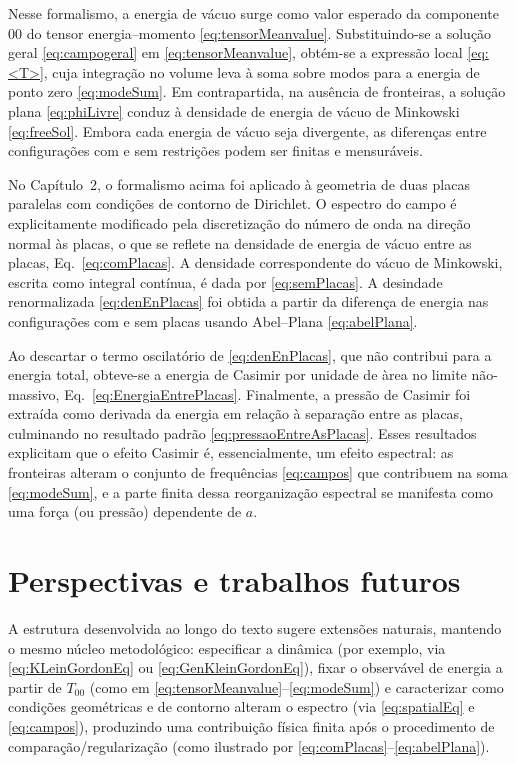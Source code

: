 Nesse formalismo, a energia de vácuo surge como valor esperado da componente $00$ do tensor energia--momento \eqref{eq:tensorMeanvalue}. Substituindo-se a solução geral \eqref{eq:campogeral} em \eqref{eq:tensorMeanvalue}, obtém-se a expressão local \eqref{eq:<T>}, cuja integração no volume leva à soma sobre modos para a energia de ponto zero \eqref{eq:modeSum}. Em contrapartida, na ausência de fronteiras, a solução plana \eqref{eq:phiLivre} conduz à densidade de energia de vácuo de Minkowski \eqref{eq:freeSol}. Embora cada energia de vácuo seja divergente, as diferenças entre configurações com e sem restrições podem ser finitas e mensuráveis.

No Capítulo~2, o formalismo acima foi aplicado à geometria de duas placas paralelas com condições de contorno de Dirichlet. O espectro do campo é explicitamente modificado pela discretização do número de onda na direção normal às placas, o que se reflete na densidade de energia de vácuo entre as placas, Eq.~\eqref{eq:comPlacas}. A densidade correspondente do vácuo de Minkowski, escrita como integral contínua, é dada por \eqref{eq:semPlacas}. A desindade renormalizada \eqref{eq:denEnPlacas} foi obtida a partir da diferença de energia nas configurações com e sem placas usando Abel--Plana \eqref{eq:abelPlana}.

Ao descartar o termo oscilatório de \eqref{eq:denEnPlacas}, que não contribui para a energia total, obteve-se a energia de Casimir por unidade de àrea no limite não-massivo, Eq.~\eqref{eq:EnergiaEntrePlacas}. Finalmente, a pressão de Casimir foi extraída como derivada da energia em relação à separação entre as placas, culminando no resultado padrão \eqref{eq:pressaoEntreAsPlacas}. Esses resultados explicitam que o efeito Casimir é, essencialmente, um efeito espectral: as fronteiras alteram o conjunto de frequências \eqref{eq:campos} que contribuem na soma \eqref{eq:modeSum}, e a parte finita dessa reorganização espectral se manifesta como uma força (ou pressão) dependente de $a$.

\section{Perspectivas e trabalhos futuros}
\label{sec:perspectivas}

A estrutura desenvolvida ao longo do texto sugere extensões naturais, mantendo o mesmo núcleo metodológico: especificar a dinâmica (por exemplo, via \eqref{eq:KLeinGordonEq} ou \eqref{eq:GenKleinGordonEq}), fixar o observável de energia a partir de $T_{00}$ (como em \eqref{eq:tensorMeanvalue}--\eqref{eq:modeSum}) e caracterizar como condições geométricas e de contorno alteram o espectro (via \eqref{eq:spatialEq} e \eqref{eq:campos}), produzindo uma contribuição física finita após o procedimento de comparação/regularização (como ilustrado por \eqref{eq:comPlacas}--\eqref{eq:abelPlana}).

